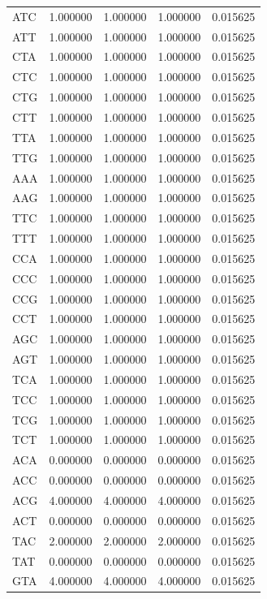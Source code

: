 \begin{tabular}{lrrrr}
ATC & 1.000000 & 1.000000 & 1.000000 & 0.015625 \\
ATT & 1.000000 & 1.000000 & 1.000000 & 0.015625 \\
CTA & 1.000000 & 1.000000 & 1.000000 & 0.015625 \\
CTC & 1.000000 & 1.000000 & 1.000000 & 0.015625 \\
CTG & 1.000000 & 1.000000 & 1.000000 & 0.015625 \\
CTT & 1.000000 & 1.000000 & 1.000000 & 0.015625 \\
TTA & 1.000000 & 1.000000 & 1.000000 & 0.015625 \\
TTG & 1.000000 & 1.000000 & 1.000000 & 0.015625 \\
AAA & 1.000000 & 1.000000 & 1.000000 & 0.015625 \\
AAG & 1.000000 & 1.000000 & 1.000000 & 0.015625 \\
TTC & 1.000000 & 1.000000 & 1.000000 & 0.015625 \\
TTT & 1.000000 & 1.000000 & 1.000000 & 0.015625 \\
CCA & 1.000000 & 1.000000 & 1.000000 & 0.015625 \\
CCC & 1.000000 & 1.000000 & 1.000000 & 0.015625 \\
CCG & 1.000000 & 1.000000 & 1.000000 & 0.015625 \\
CCT & 1.000000 & 1.000000 & 1.000000 & 0.015625 \\
AGC & 1.000000 & 1.000000 & 1.000000 & 0.015625 \\
AGT & 1.000000 & 1.000000 & 1.000000 & 0.015625 \\
TCA & 1.000000 & 1.000000 & 1.000000 & 0.015625 \\
TCC & 1.000000 & 1.000000 & 1.000000 & 0.015625 \\
TCG & 1.000000 & 1.000000 & 1.000000 & 0.015625 \\
TCT & 1.000000 & 1.000000 & 1.000000 & 0.015625 \\
ACA & 0.000000 & 0.000000 & 0.000000 & 0.015625 \\
ACC & 0.000000 & 0.000000 & 0.000000 & 0.015625 \\
ACG & 4.000000 & 4.000000 & 4.000000 & 0.015625 \\
ACT & 0.000000 & 0.000000 & 0.000000 & 0.015625 \\
TAC & 2.000000 & 2.000000 & 2.000000 & 0.015625 \\
TAT & 0.000000 & 0.000000 & 0.000000 & 0.015625 \\
GTA & 4.000000 & 4.000000 & 4.000000 & 0.015625 \\

\end{tabular}
